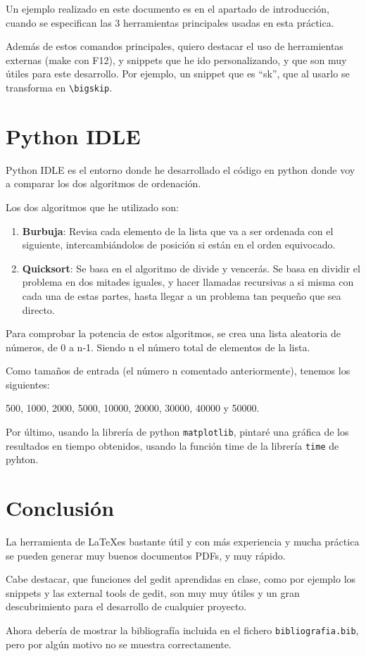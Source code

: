 \documentclass[a4,12pt]{article}
\begin{document}
Un ejemplo realizado en este documento es en el apartado de introducción, cuando se especifican las 3 herramientas principales usadas en esta práctica.

\bigskip
Además de estos comandos principales, quiero destacar el uso de herramientas externas (make con F12), y snippets que he ido personalizando, y que son muy útiles para este desarrollo. Por ejemplo, un snippet que es ``sk'', que al usarlo se transforma en \verb+\bigskip+.

\newpage
\section{Python IDLE}
Python IDLE es el entorno donde he desarrollado el código en python donde voy a comparar los dos algoritmos de ordenación.

\bigskip
\noindent Los dos algoritmos que he utilizado son:
\begin{enumerate}

\item \textbf{Burbuja}: Revisa cada elemento de la lista que va a ser ordenada con el siguiente, intercambiándolos de posición si están en el orden equivocado.

\item \textbf{Quicksort}: Se basa en el algoritmo de divide y vencerás. Se basa en dividir el problema en dos mitades iguales, y hacer llamadas recursivas a si misma con cada una de estas partes, hasta llegar a un problema tan pequeño que sea directo.
\end{enumerate}

\noindent Para comprobar la potencia de estos algoritmos, se crea una lista aleatoria de números, de 0 a n-1. Siendo n el número total de elementos de la lista.

\bigskip
Como tamaños de entrada (el número n comentado anteriormente), tenemos los siguientes:

500, 1000, 2000, 5000, 10000, 20000, 30000, 40000 y 50000.

\bigskip
Por último, usando la librería de python \texttt{matplotlib}, pintaré una gráfica de los resultados en tiempo obtenidos, usando la función time de la librería \texttt{time} de pyhton.

\newpage
\section{Conclusión}
La herramienta de \LaTeX es bastante útil y con más experiencia y mucha práctica se pueden generar muy buenos documentos PDFs, y muy rápido.

Cabe destacar, que funciones del gedit aprendidas en clase, como por ejemplo los snippets y las external tools de gedit, son muy muy útiles y un gran descubrimiento para el desarrollo de cualquier proyecto.

\bigskip
Ahora debería de mostrar la bibliografía incluida en el fichero \texttt{bibliografia.bib}, pero por algún motivo no se muestra correctamente.
{}

\end{document}
